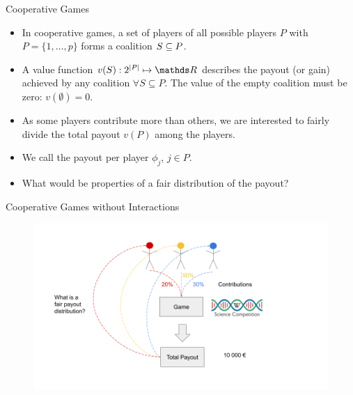 \documentclass[11pt,compress,t,notes=noshow, aspectratio=169, xcolor=table]{beamer}
\begin{document}
\begin{vbframe}{Cooperative Games}
\begin{itemize}
\itemsep1em
  \item In cooperative games, a set of players of all possible players $P$ with $P = \{1, \hdots, p\}$ forms a coalition $\SsubP$.
  \item A value function $v(S): 2^{|P|}\mapsto \R$ describes the payout (or gain) achieved by any coalition $\forall S \subseteq P$. The value of the empty coalition must be zero: $v(\emptyset) = 0$.
  \item As some players contribute more than others, we are interested to fairly divide the total payout $v(P)$ among the players.
  \item We call the payout per player $\phi_j$, $j \in P$.
  \item What would be properties of a fair distribution of the payout?
\end{itemize}
\end{vbframe}

\begin{vbframe}{Cooperative Games without Interactions}

\begin{figure}
    \centering
    \includegraphics{slides/shapley/figure/Shapley_1.png}
\end{figure}

\end{vbframe}
\end{document}
